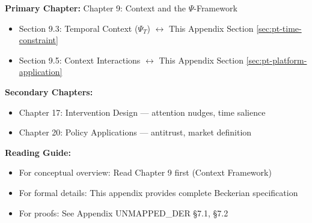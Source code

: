 
\begin{tcolorbox}[colback=purple!5!white, colframe=purple!75!black,
    title=Chapter Linkage]

\textbf{Primary Chapter:} Chapter 9: Context and the $\Psi$-Framework
\begin{itemize}[nosep]
\item Section 9.3: Temporal Context ($\Psi_T$) $\leftrightarrow$ This Appendix Section \ref{sec:pt-time-constraint}
\item Section 9.5: Context Interactions $\leftrightarrow$ This Appendix Section \ref{sec:pt-platform-application}
\end{itemize}

\textbf{Secondary Chapters:}
\begin{itemize}[nosep]
\item Chapter 17: Intervention Design --- attention nudges, time salience
\item Chapter 20: Policy Applications --- antitrust, market definition
\end{itemize}

\textbf{Reading Guide:}
\begin{itemize}[nosep]
\item For conceptual overview: Read Chapter 9 first (Context Framework)
\item For formal details: This appendix provides complete Beckerian specification
\item For proofs: See Appendix UNMAPPED_DER §7.1, §7.2
\end{itemize}

\end{tcolorbox}


\begin{abstract}
This appendix integrates Becker's (1965) Time Allocation Theory into the EBF framework,
with particular application to digital platform economics. We formalize how time constraints
affect consumer demand when monetary prices approach zero, deriving predictions for
substitution patterns (diversion ratios) based on time cost shares. The framework explains
why Facebook and Instagram are close substitutes despite being ``free''---their similar
time shares predict high diversion ratios. Policy implications include revised antitrust
market definitions and attention-based intervention design.

\textit{Theory Catalog Reference: UNMAPPED_CAT-17 (MS-TA-001, MS-TA-002, MS-TA-003)}
\end{abstract}

